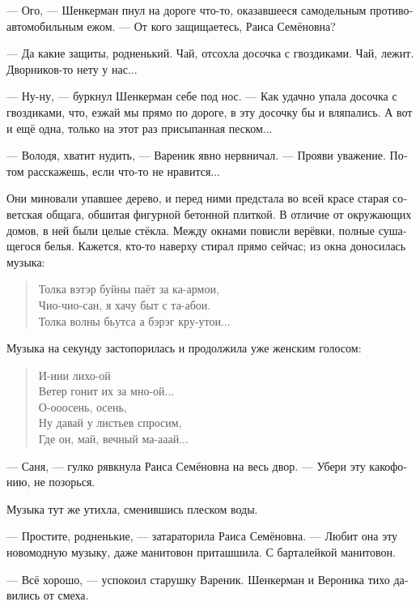 \documentclass[a5paper,12pt,fleqn]{extbook}\usepackage{cooltooltips}\usepackage{polyglossia}\setdefaultlanguage[babelshorthands=true]{russian}\setotherlanguage{english}\defaultfontfeatures{Ligatures=TeX,Mapping=tex-text} \usepackage{xcolor}\definecolor{lightgray}{HTML}{bbbbbb}\color{lightgray}\newcommand{\ml}[3]{\textenglish{\textcolor{black}{#3}}}
\newcommand{\asterism}{\vspace{1em}{\centering\Large\bfseries$\ast~\ast~\ast$\par}\vspace{1em}}
\newcommand{\textspace}{\vspace{1em}{\centering\Large\bfseries<...>\par}\vspace{1em}}
\begin{document}
--- Ого, --- Шенкерман пнул на дороге что-то, оказавшееся самодельным противоавтомобильным ежом.
--- От кого защищаетесь, Раиса Семёновна?

--- Да какие защиты, родненький.
Чай, отсохла досочка с гвоздиками.
Чай, лежит.
Дворников-то нету у нас...

--- Ну-ну, --- буркнул Шенкерман себе под нос.
--- Как удачно упала досочка с гвоздиками, что, езжай мы прямо по дороге, в эту досочку бы и вляпались.
А вот и ещё одна, только на этот раз присыпанная песком...

--- Володя, хватит нудить, --- Вареник явно нервничал.
--- Прояви уважение.
Потом расскажешь, если что-то не нравится...

Они миновали упавшее дерево, и перед ними предстала во всей красе старая советская общага, обшитая фигурной бетонной плиткой.
В отличие от окружающих домов, в ней были целые стёкла.
Между окнами повисли верёвки, полные сушащегося белья.
Кажется, кто-то наверху стирал прямо сейчас;
из окна доносилась музыка:

\begin{quote}
Толка вэтэр буйны паёт за ка-армои,\\
Чио-чио-сан, я хачу быт с та-абои.\\
Толка волны бьутса а бэрэг кру-утои...
\end{quote}

Музыка на секунду застопорилась и продолжила уже женским голосом:

\begin{quote}
И-иии лихо-ой\\
Ветер гонит их за мно-ой...\\
О-ооосень, осень,\\
Ну давай у листьев спросим,\\
Где он, май, вечный ма-ааай...
\end{quote}

--- Саня, --- гулко рявкнула Раиса Семёновна на весь двор.
--- Убери эту какофонию, не позорься.

Музыка тут же утихла, сменившись плеском воды.

--- Простите, родненькие, --- затараторила Раиса Семёновна.
--- Любит она эту новомодную музыку, даже манитовон приташшила.
С барталейкой манитовон.

--- Всё хорошо, --- успокоил старушку Вареник.
Шенкерман и Вероника тихо давились от смеха.

\asterism

\textspace
\end{document}
